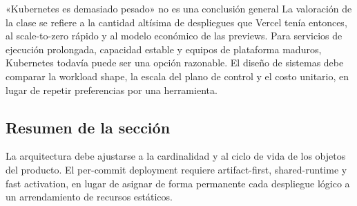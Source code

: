 \begin{warningbox}{«Kubernetes es demasiado pesado» no es una conclusión general}
La valoración de la clase se refiere a la cantidad altísima de despliegues que Vercel tenía entonces, al scale-to-zero rápido y al modelo económico de las previews. Para servicios de ejecución prolongada, capacidad estable y equipos de plataforma maduros, Kubernetes todavía puede ser una opción razonable. El diseño de sistemas debe comparar la workload shape, la escala del plano de control y el costo unitario, en lugar de repetir preferencias por una herramienta.
\end{warningbox}


\subsection{Resumen de la sección}

La arquitectura debe ajustarse a la cardinalidad y al ciclo de vida de los objetos del producto. El per-commit deployment requiere artifact-first, shared-runtime y fast activation, en lugar de asignar de forma permanente cada despliegue lógico a un arrendamiento de recursos estáticos.
